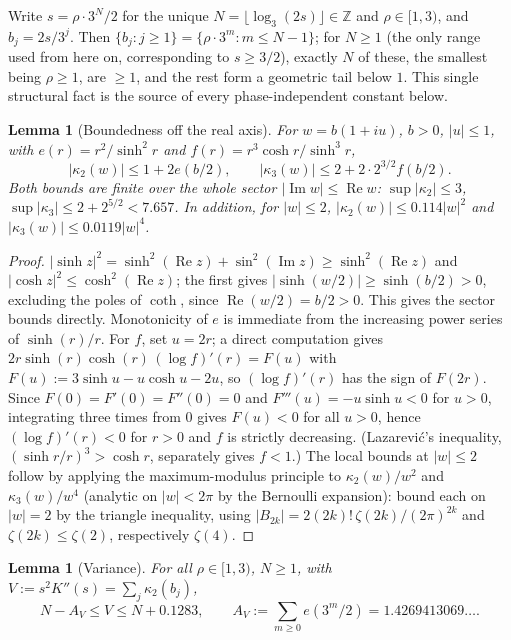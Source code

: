 \documentclass[11pt]{amsart}
\theoremstyle{plain}
\newtheorem{lemma}[theorem]{Lemma}
\theoremstyle{definition}
\theoremstyle{remark}
\newcommand{\Z}{\mathbb{Z}}
\begin{document}
Write $s = \rho\cdot 3^N/2$ for the unique $N = \lfloor \log_3(2s)\rfloor \in \Z$ and $\rho \in
[1,3)$, and $b_j = 2s/3^j$. Then $\{b_j : j \ge 1\} = \{\rho\cdot 3^m : m \le N-1\}$; for $N \ge 1$
(the only range used from here on, corresponding to $s \ge 3/2$), exactly $N$ of these, the
smallest being $\rho \ge 1$, are $\ge 1$, and the rest form a geometric tail below $1$. This single
structural fact is the source of every phase-independent constant below.

\begin{lemma}[Boundedness off the real axis]
\label{lem:kappa}
For $w = b(1+iu)$, $b>0$, $|u|\le 1$, with $e(r) = r^2/\sinh^2 r$ and $f(r) = r^3\cosh r/\sinh^3 r$,
\[
|\kappa_2(w)| \le 1 + 2e(b/2), \qquad |\kappa_3(w)| \le 2 + 2\cdot 2^{3/2} f(b/2).
\]
Both bounds are finite over the whole sector $|\operatorname{Im}w|\le\operatorname{Re}w$:
$\sup|\kappa_2|\le3$, $\sup|\kappa_3|\le2+2^{5/2}<7.657$. In addition, for $|w|\le2$,
$|\kappa_2(w)| \le 0.114|w|^2$ and $|\kappa_3(w)|\le 0.0119|w|^4$.
\end{lemma}

\begin{proof}
$|\sinh z|^2 = \sinh^2(\operatorname{Re}z)+\sin^2(\operatorname{Im}z) \ge \sinh^2(\operatorname{Re}z)$
and $|\cosh z|^2 \le \cosh^2(\operatorname{Re}z)$; the first gives $|\sinh(w/2)|\ge\sinh(b/2)>0$,
excluding the poles of $\coth$, since $\operatorname{Re}(w/2)=b/2>0$. This gives the sector bounds directly.
Monotonicity of $e$ is immediate from the increasing power series of $\sinh(r)/r$. For $f$, set
$u=2r$; a direct computation gives $2r\sinh(r)\cosh(r)\,(\log f)'(r) = F(u)$ with
$F(u):=3\sinh u - u\cosh u - 2u$, so $(\log f)'(r)$ has the sign of $F(2r)$. Since
$F(0)=F'(0)=F''(0)=0$ and $F'''(u)=-u\sinh u<0$ for $u>0$, integrating three times from $0$ gives
$F(u)<0$ for all $u>0$, hence $(\log f)'(r)<0$ for $r>0$ and $f$ is strictly decreasing.
(Lazarevi\'c's inequality, $(\sinh r/r)^3 > \cosh r$, separately gives $f<1$.) The local bounds
at $|w|\le2$ follow by applying the maximum-modulus principle to $\kappa_2(w)/w^2$ and
$\kappa_3(w)/w^4$ (analytic on $|w|<2\pi$ by the Bernoulli expansion): bound each on $|w|=2$ by the
triangle inequality, using $|B_{2k}| = 2(2k)!\,\zeta(2k)/(2\pi)^{2k}$ and $\zeta(2k)\le\zeta(2)$,
respectively $\zeta(4)$.
\end{proof}

\begin{lemma}[Variance]
\label{lem:variance}
For all $\rho\in[1,3)$, $N\ge1$, with $V := s^2K''(s) = \sum_j\kappa_2(b_j)$,
\[
N - A_V \le V \le N + 0.1283, \qquad A_V := \sum_{m\ge0} e(3^m/2) = 1.4269413069\ldots.
\]
\end{lemma}
\end{document}
